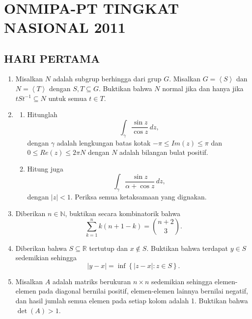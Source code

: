 \documentclass[12pt,twoside]{article}
\author{Firmansyah M.I.D}
\begin{document}
\makecovernasional
\nopagecolor
$~$
\thispagestyle{empty}
\pagebreak

\rhead{}
\tableofcontents
\pagebreak
\chead{}
\section{ONMIPA-PT TINGKAT NASIONAL 2011}
\subsection{HARI PERTAMA}
\begin{enumerate}
    \item Misalkan $N$ adalah subgrup berhingga dari grup $G$. Misalkan $G=\left<S\right>$ dan $N=\left<T\right>$ dengan $S,T\subseteq G$. Buktikan bahwa $N$ normal jika dan hanya jika $tSt^{-1}\subseteq N$ untuk semua $t\in T$.

    \item \begin{enumerate}
              \item[(a.)] Hitunglah
                    $$\int_{\gamma}\dfrac{\sin z}{\cos z}\,dz,$$
                    dengan $\gamma $ adalah lengkungan batas kotak $-\pi\leq Im(z)\leq \pi$ dan $0\leq Re(z)\leq 2\pi N$ dengan $N$ adalah bilangan bulat positif.
              \item[(a.)] Hitung juga
                    $$\int_{\gamma}\dfrac{\sin z}{\alpha+\cos z}\,dz,$$
                    dengan $|z|<1$. Periksa semua ketaksamaan yang dignakan.
          \end{enumerate}

    \item Diberikan $n\in \mathbb{N}$, buktikan secara kombinatorik bahwa
          $$\sum_{k=1}^{n}k\left(n+1-k\right)=\binom{n+2}{3}.$$

    \item Diberikan bahwa $S\subseteq \mathbb{R}$ tertutup dan $x\notin S$. Buktikan bahwa terdapat $y\in S$ sedemikian sehingga
          $$|y-x|=\inf\left\{|z-x|:z\in S\right\}.$$

    \item
          Misalkan $A$ adalah matriks berukuran $n\times n$ sedemikian sehingga elemen-elemen pada diagonal bernilai positif, elemen-elemen lainnya bernilai negatif, dan hasil jumlah semua elemen pada setiap kolom adalah 1. Buktikan  bahwa $\det(A)>1$.
\end{enumerate}
\newpage
\end{document}
